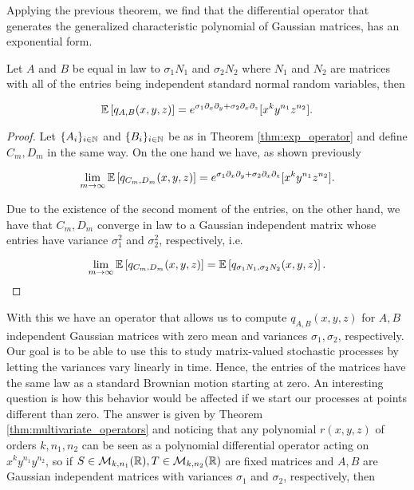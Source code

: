     Applying the previous theorem, we find that the differential operator that generates the generalized characteristic polynomial of Gaussian matrices, has an exponential form.

    \begin{corollary}
        Let $A$ and $B$ be equal in law to $\sigma_1 N_1$ and $\sigma_2 N_2$ where $N_1$ and $N_2$ are matrices with all of the entries being independent standard normal random variables, then
        
        \begin{equation*}
            \mathbb E \left[  q_{A,B}(x,y,z)  \right] = e^{\sigma_1 \partial_x \partial_y + \sigma_2 \partial_x \partial_z}[x^k y^{n_1} z^{n_2}].
        \end{equation*}
        \end{corollary}

        \begin{proof}
            Let $\{A_i\}_{i\in \mathbb N}$ and $\{B_i\}_{i\in \mathbb N}$ be as in Theorem \ref{thm:exp_operator} and define $C_m, D_m$ in the same way. On the one hand we have, as shown previously

            \begin{equation*}
                \lim_{m\to \infty} \mathbb E \left[  q_{C_m,D_m}(x,y,z) \right] =  e^{\sigma_1 \partial_x \partial_y + \sigma_2 \partial_x \partial_z}[x^k y^{n_1} z^{n_2}].
            \end{equation*}

            Due to the existence of the second moment of the entries, on the other hand, we have that $C_m, D_m$ converge in law to a Gaussian independent matrix whose entries have variance $\sigma_1^2$ and $\sigma_2^2$, respectively, i.e.

            \begin{equation*}
                \lim_{m\to \infty} \mathbb E \left[  q_{C_m,D_m}(x,y,z) \right] = \mathbb E \left[  q_{\sigma_1 N_1, \sigma_2 N_2}(x,y,z) \right].
            \end{equation*}        
        \end{proof}

        With this we have an operator that allows us to compute $q_{A,B}(x,y,z)$ for $A,B$ independent Gaussian matrices with zero mean and variances $\sigma_1,\sigma_2$, respectively. Our goal is to be able to use this to study matrix-valued stochastic processes by letting the variances vary linearly in time. Hence, the entries of the matrices have the same law as a standard Brownian motion starting at zero. An interesting question is how this behavior would be affected if we start our processes at points different than zero. The answer is given by Theorem \ref{thm:multivariate_operators} and noticing that any polynomial $r(x,y,z)$ of orders $k,n_1,n_2$ can be seen as a polynomial differential operator acting on $x^ky^{n_1}y^{n_2}$, so if $S\in \mathcal M_{k,n_1}(\mathbb R),T\in \mathcal M_{k,n_2}(\mathbb R)$ are fixed matrices and $A, B$ are Gaussian independent matrices with variances $\sigma_1$ and $\sigma_2$, respectively, then

